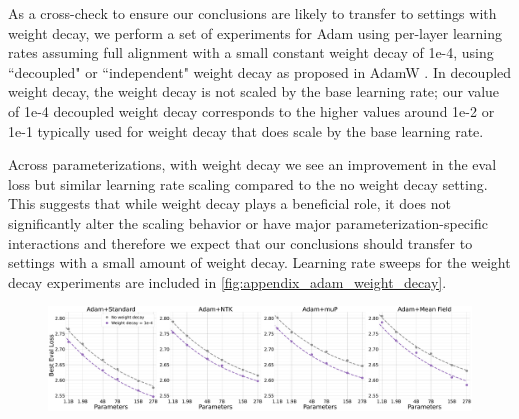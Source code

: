 As a cross-check to ensure our conclusions are likely to transfer to settings with weight decay, we perform a set of experiments for Adam using per-layer learning rates assuming full alignment with a small constant weight decay of 1e-4, using ``decoupled" or ``independent" weight decay as proposed in AdamW \citep{loshchilov2018decoupled}. In decoupled weight decay, the weight decay is not scaled by the base learning rate; our value of 1e-4 decoupled weight decay corresponds to the higher values around 1e-2 or 1e-1 typically used for weight decay that does scale by the base learning rate.

Across parameterizations, with weight decay we see an improvement in the eval loss but similar learning rate scaling compared to the no weight decay setting. This suggests that while weight decay plays a beneficial role, it does not significantly alter the scaling behavior or have major parameterization-specific interactions and therefore we expect that our conclusions should transfer to settings with a small amount of weight decay. Learning rate sweeps for the weight decay experiments are included in  \cref{fig:appendix_adam_weight_decay}.

\vspace{48pt}

\begin{figure}[ht]
    \begin{center}
        \includegraphics[width=\linewidth, trim={0, 0, 0, 0},clip]{icml2024/figures/wd_appendix/wd_per_module_lr_scaling_plot.pdf}
       
        \caption{}
        \label{fig:wd_lr_sweeps}
    \end{center}
\end{figure}

\vfill

